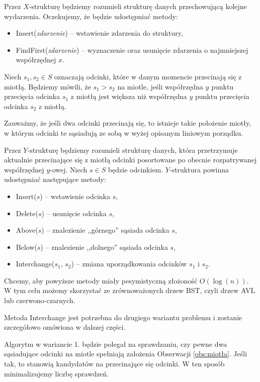 Przez $X$-strukturę będziemy rozumieli strukturę danych przechowującą 
kolejne wydarzenia. Oczekujemy, że będzie udostępniać metody:
\begin{itemize}
	\item Insert(\textit{zdarzenie})  -- wstawienie zdarzenia do struktury,
	\item FindFirst(\textit{zdarzenie})  -- wyznaczenie oraz usunięcie zdarzenia
	o najmniejszej współrzędnej $x$.
\end{itemize}


Niech $s_1, s_2 \in S$ oznaczają odcinki, które w danym momencie przecinają się 
z miotłą. Będziemy mówili, że $s_1 > s_2$ na miotle,
jeśli współrzędna $y$ punktu przecięcia odcinka $s_1$ z miotłą jest większa 
niż współrzędna $y$ punktu przecięcia odcinka $s_2$ z miotłą.

\begin{obs}
	\label{obs:miotła}
	Zauważmy, że jeśli dwa odcinki przecinają się, to istnieje takie położenie
	miotły, w którym odcinki te sąsiadują ze sobą w wyżej opisanym liniowym porządku.
\end{obs} 

Przez $Y$-strukturę będziemy rozumieli strukturę danych, która przetrzymuje aktualnie przecinające się 
z miotłą odcinki posortowane po obecnie rozpatrywanej współrzędnej $y$-owej. Niech $s \in S$ będzie odcinkiem. $Y$-struktura 
powinna udostępniać następujące metody:
\begin{itemize}
	\item Insert($s$) -- wstawienie odcinka $s$,
	\item Delete($s$) -- usunięcie odcinka $s$,
	\item Above($s$) -- znalezienie ,,górnego'' sąsiada odcinka $s$,
	\item Below($s$) -- znalezienie ,,dolnego'' sąsiada odcinka $s$,

	\item Interchange($s_1$, $s_2$) -- zmiana uporządkowania odcinków $s_1$ i $s_2$.
\end{itemize}
Chcemy, aby powyższe metody miały pesymistyczną złożoność $O(\log(n))$. W tym celu możemy skorzystać ze zrównoważonych drzew BST, czyli
drzew AVL lub czerwono-czarnych.

Metoda Interchange jest potrzebna do drugiego wariantu 
problemu i zostanie szczegółowo omówiona w dalszej części.

Algorytm w {wariancie 1.} będzie polegał na sprawdzaniu, 
czy pewne dwa sąsiadujące odcinki na miotle spełniają założenia 
Obserwacji \ref{obs:miotła}. Jeśli tak, to stanowią kandydatów na przecinające 
się odcinki. W ten sposób minimalizujemy liczbę sprawdzeń.

